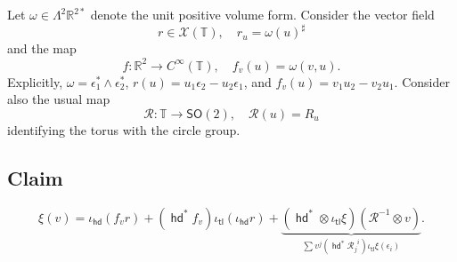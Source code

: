 \documentclass{amsart}
\def\RR{\mathbb{R}}
\def\TT{\mathbb{T}}
\def\XX{\mathscr{X}}
\def\sR{\mathscr{R}}
\def\SO{\mathsf{SO}}
\DeclareMathOperator{\tail}{\mathsf{tl}}
\DeclareMathOperator{\head}{\mathsf{hd}}
\theoremstyle{definition}
\begin{document}
\subsection{}
Let $\omega \in\Lambda^2\RR^{2*}$
denote the unit positive volume form.
Consider the vector field 
$$ r \in \XX(\TT),\quad r_u = \omega(u)^\sharp $$
and the map
$$ f : \RR^2 \to C^\infty(\TT),\quad f_v(u)= \omega(v,u).$$
Explicitly, $\omega=\epsilon_1^*\wedge\epsilon_2^*$,
$r(u) = u_1 \epsilon_2 - u_2\epsilon_1$,
and $f_v(u) = v_1u_2-v_2u_1$.  Consider also the usual map
$$ \sR : \TT \to \SO(2),\quad \sR(u) = R_u  $$
identifying the torus with the circle group.

\subsection{Claim}
$$
\xi(v) = \iota_{\head} (f_v r) + (\head^* f_v) \iota_{\tail} (\iota_{\head} r)
+ \underbrace{(\head^* \otimes \iota_{\tail}\xi) (\sR^{-1}\otimes v)}_{
\sum v^j (\head^*{\sR_j}^i) \iota_{\tail} \xi(\epsilon_i)}.
$$
\end{document}
